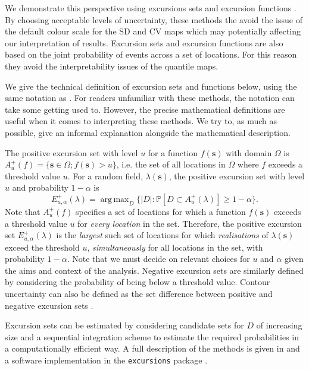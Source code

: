 \documentclass{stylefile16/statsoc}
\newcommand{\bs}{\mathbf{s}}
\DeclareMathOperator*{\argmax}{arg\,max}  %
\begin{document}
We demonstrate this perspective using excursions sets and excursion functions \citep{bolin_excursion_2015}. By choosing acceptable levels of uncertainty, these methods the avoid the issue of the default colour scale for the SD and CV maps which may potentially affecting our interpretation of results.  Excursion sets and excursion functions are also based on the joint probability of events across a set of locations.  For this reason they avoid the interpretability issues of the quantile maps.

We give the technical definition of excursion sets and functions below, using the same notation as \cite{bolin_excursion_2015}.  For readers unfamiliar with these methods, the notation can take some getting used to.  However, the precise mathematical definitions are useful when it comes to interpreting these methods.  We try to, as much as possible, give an informal explanation alongside the mathematical description.

The positive excursion set with level $u$ for a function $f(\bs)$ with domain $\Omega$ is $A_u^{+}(f) = \{ \bs \in \Omega ; f(\bs) > u \}$, i.e. the set of all locations in $\Omega$ where $f$ exceeds a threshold value $u$. For a random field, $\lambda(\bs)$, the positive excursion set with level $u$ and probability $1 - \alpha$ is
\begin{equation*}
E_{u,\alpha}^{+}(\lambda) = \argmax_{D}\{\lvert D \rvert : \mathbb{P}\left[D \subset A_u^{+}(\lambda)\right] \geq 1 - \alpha \} .
\end{equation*}
Note that $A_u^{+}(f)$ specifies a set of locations for which a function $f(\bs)$ exceeds a threshold value $u$ for \textit{every location} in the set. Therefore, the positive excursion set $E_{u,\alpha}^{+}(\lambda)$ is the \textit{largest} such set of locations for which \textit{realisations} of $\lambda(\bs)$ exceed the threshold $u$, \textit{simultaneously} for all locations in the set, with probability $1-\alpha$.  Note that we must decide on relevant choices for $u$ and $\alpha$ given the aims and context of the analysis.  Negative excursion sets are similarly defined by considering the probability of being below a threshold value.  Contour uncertainty can also be defined as the set difference between positive and negative excursion sets \citep{bolin_excursion_2015}.

Excursion sets can be estimated by considering candidate sets for $D$ of increasing size and a sequential integration scheme to estimate the required probabilities in a computationally efficient way.  A full description of the methods is given in \cite{bolin_excursion_2015} and a software implementation in the \texttt{excursions} package \citep{bolin_calculating_2018}.  
\end{document}
